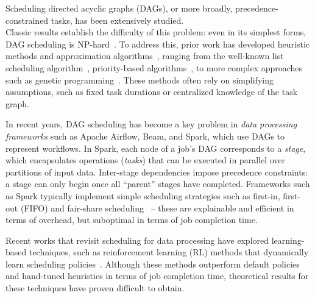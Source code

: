 Scheduling directed acyclic graphs (DAGs), or more broadly, precedence-constrained tasks, has been extensively studied.\\ 
Classic results establish the difficulty of this problem: even in its simplest forms, DAG scheduling is NP-hard~\cite{Lenstra:78}. 
To address this, prior work has developed heuristic methods and approximation algorithms~\cite{Su:24:Tompecs, Chudak:99, Lassota:23, Li:17, Davies:20, Davies:21, Maiti:20, Su:23}, ranging from the well-known list scheduling algorithm~\cite{Graham:66}, priority-based algorithms~\cite{Sels:12:Priority}, to more complex approaches such as genetic programming~\cite{Cheng:96:Genetic, Pezzella:08:Genetic, Davis:14:Genetic}. These methods often rely on simplifying assumptions, such as fixed task durations or centralized knowledge of the task graph.  %


In recent years, DAG scheduling has become %
a key problem in \textit{data processing frameworks} such as Apache Airflow, Beam, and Spark, which use DAGs to represent workflows. 
In Spark, each node of a job's DAG corresponds to a \textit{stage}, which encapsulates operations (\textit{tasks}) that can be executed in parallel over partitions of input data. Inter-stage dependencies impose precedence constraints: a stage can only begin once all ``parent'' stages have completed. 
Frameworks such as Spark typically implement simple scheduling strategies such as first-in, first-out (FIFO) and fair-share scheduling~\cite{SparkScheduling} -- these are explainable and efficient in terms of overhead, but suboptimal in terms of job completion time.

Recent works that revisit scheduling %
for data processing have explored %
learning-based techniques, such as reinforcement learning (RL) methods that dynamically learn scheduling policies~\cite{Hongzi:2019:Decima, Wu:18, Li:23, Grinsztajn:20, Zhou:22, Islam:21}.  Although these methods outperform default policies and hand-tuned heuristics in terms of job completion time, theoretical results for these techniques have proven difficult to obtain.



